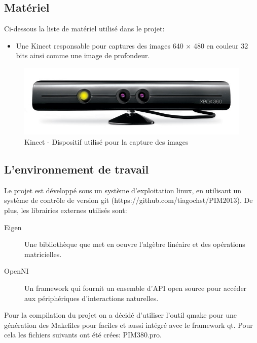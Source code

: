 \documentclass[a4paper,12pt]{article}
\begin{document}
\subsection{Matériel}

Ci-dessous la liste de matériel utilisé dans le projet: 

\begin{itemize}
\item Une Kinect responsable pour captures des images 640 × 480 en
  couleur 32 bits ainsi comme une image de profondeur.  
\end{itemize}

\begin{figure}[h!]
  \begin{center}
    \includegraphics[scale=0.2]{img/kinect.jpg}
    \caption{Kinect - Dispositif utilisé pour la capture des images}
  \end{center}
\end{figure}

\subsection{L'environnement de travail}

Le projet est développé sous un système d'exploitation linux, en
utilisant un système de contrôle de version git
(https://github.com/tiagochst/PIM2013).  
De plus, les librairies externes utilisés sont:

\begin{description}
\item[Eigen] Une bibliothèque que met en oeuvre l'algèbre linéaire et des opérations matricielles.
\item[OpenNI] Un framework qui fournit un ensemble d'API open source
  pour accéder aux périphériques d'interactions naturelles.\cite{PrimeSense2010}
  
\end{description}

Pour la compilation du projet on a décidé d’utiliser l’outil qmake
pour une génération des Makefiles pour faciles et aussi intégré avec
le framework qt.  
Pour cela les fichiers suivants ont été crées: PIM380.pro. 
\end{document}
